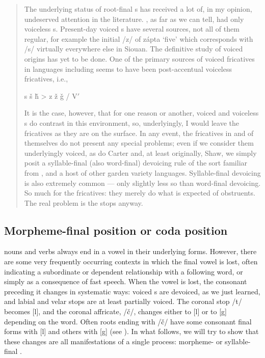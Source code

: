 \documentclass[output=paper]{LSP/langsci}
\begin{document}
\begin{quote}The underlying status of  root-final s has received a lot of, in my opinion, undeserved attention in the literature. , as far as we can tell, had only voiceless s. Present-day voiced s have several sources, not all of them regular, for example the initial /z/ of zápta `five' which corresponds with /s/ virtually everywhere else in Siouan. The definitive study of voiced  origins has yet to be done. One of the primary sources of voiced fricatives in  languages including  seems to have been post-accentual voiceless fricatives, i.e.,\vspace{-1em}
\begin{center}
s \v{s} \v{h} > z \v{z} \v{g} / V$'$  \underline{\hspace{1em}}
\end{center}
\vspace{-1em}
It is the case, however, that for one reason or another, voiced and voiceless s do contrast in this environment, so, underlyingly, I would leave the fricatives as they are on the surface. In any event, the fricatives in and of themselves do not present any special problems; even if we consider them underlyingly voiced, as do Carter and, at least originally, Shaw, we simply posit a syllable-final (also word-final) devoicing rule of the sort familiar from ,  and a host of other garden variety languages. Syllable-final devoicing is also extremely common --- only slightly less so than word-final devoicing. So much for the fricatives: they merely do what is expected of obstruents. The real problem is the stops anyway.\end{quote}

\subsection{Morpheme-final position or coda position}

 nouns and verbs always end in a vowel in their underlying forms. However, there are some very frequently occurring contexts in which the final vowel is lost, often indicating a subordinate or dependent relationship with a following word, or simply as a consequence of fast speech. When the vowel is lost, the consonant preceding it changes in systematic ways: voiced s are devoiced, as we just learned, and labial and velar stops are at least partially voiced. The coronal stop /t/ becomes [l], and the coronal affricate, /\v{c}/, changes either to [l] or to [g] depending on the word. Often roots ending with /\v{c}/ have some consonant final forms with [l] and others with [g] (see ). In what follows, we will try to show that these changes are all manifestations of a single process: morpheme- or syllable-final .
\end{document}
